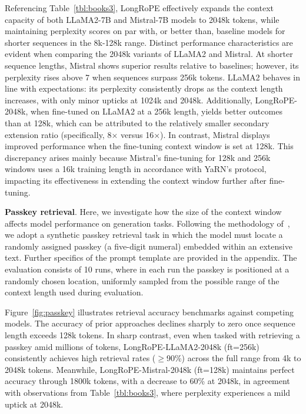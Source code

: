 Referencing Table~\ref{tbl:books3}, LongRoPE effectively expands the context capacity of both LLaMA2-7B and Mistral-7B models to 2048k tokens, while maintaining perplexity scores on par with, or better than, baseline models for shorter sequences in the 8k-128k range. Distinct performance characteristics are evident when comparing the 2048k variants of LLaMA2 and Mistral. At shorter sequence lengths, Mistral shows superior results relative to baselines; however, its perplexity rises above 7 when sequences surpass 256k tokens. LLaMA2 behaves in line with expectations: its perplexity consistently drops as the context length increases, with only minor upticks at 1024k and 2048k. Additionally, LongRoPE-2048k, when fine-tuned on LLaMA2 at a 256k length, yields better outcomes than at 128k, which can be attributed to the relatively smaller secondary extension ratio (specifically, 8$\times$ versus 16$\times$). In contrast, Mistral displays improved performance when the fine-tuning context window is set at 128k. This discrepancy arises mainly because Mistral's fine-tuning for 128k and 256k windows uses a 16k training length in accordance with YaRN's protocol, impacting its effectiveness in extending the context window further after fine-tuning.

\textbf{Passkey retrieval}. Here, we investigate how the size of the context window affects model performance on generation tasks. Following the methodology of~\cite{passkey}, we adopt a synthetic passkey retrieval task in which the model must locate a randomly assigned passkey (a five-digit numeral) embedded within an extensive text. Further specifics of the prompt template are provided in the appendix. The evaluation consists of 10 runs, where in each run the passkey is positioned at a randomly chosen location, uniformly sampled from the possible range of the context length used during evaluation.

Figure~\ref{fig:passkey} illustrates retrieval accuracy benchmarks against competing models. The accuracy of prior approaches declines sharply to zero once sequence length exceeds 128k tokens. In sharp contrast, even when tasked with retrieving a passkey amid millions of tokens, LongRoPE-LLaMA2-2048k (ft=256k) consistently achieves high retrieval rates ($\ge$90\%) across the full range from 4k to 2048k tokens. Meanwhile, LongRoPE-Mistral-2048k (ft=128k) maintains perfect accuracy through 1800k tokens, with a decrease to 60\% at 2048k, in agreement with observations from Table~\ref{tbl:books3}, where perplexity experiences a mild uptick at 2048k.

